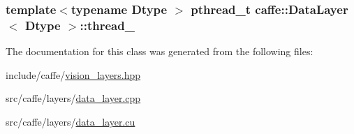 \hypertarget{classcaffe_1_1_data_layer_a62fda7f98477da13464f787e72be0b09}{
\subsubsection[{thread\+\_\+}]{\setlength{\rightskip}{0pt plus 5cm}template$<$typename Dtype $>$ pthread\+\_\+t {\bf caffe\+::\+Data\+Layer}$<$ Dtype $>$\+::thread\+\_\+\hspace{0.3cm}{\ttfamily [protected]}}}\label{classcaffe_1_1_data_layer_a62fda7f98477da13464f787e72be0b09}


The documentation for this class was generated from the following files\+:\begin{DoxyCompactItemize}
\item 
include/caffe/\hyperlink{vision__layers_8hpp}{vision\+\_\+layers.\+hpp}\item 
src/caffe/layers/\hyperlink{data__layer_8cpp}{data\+\_\+layer.\+cpp}\item 
src/caffe/layers/\hyperlink{data__layer_8cu}{data\+\_\+layer.\+cu}\end{DoxyCompactItemize}
